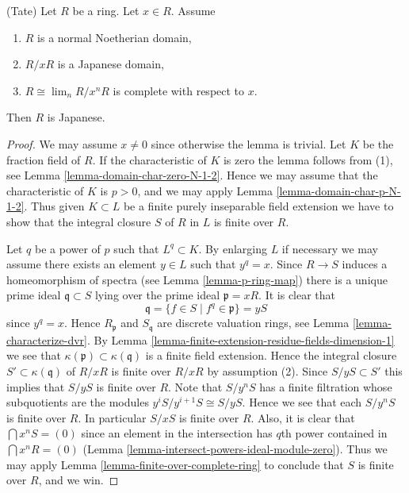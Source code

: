 \begin{lemma}
\label{lemma-tate-japanese}
(Tate)
Let $R$ be a ring.
Let $x \in R$.
Assume
\begin{enumerate}
\item $R$ is a normal Noetherian domain,
\item $R/xR$ is a Japanese domain,
\item $R \cong \lim_n R/x^nR$ is complete with respect to $x$.
\end{enumerate}
Then $R$ is Japanese.
\end{lemma}

\begin{proof}
We may assume $x \not = 0$ since otherwise the lemma is trivial.
Let $K$ be the fraction field of $R$. If the characteristic of $K$
is zero the lemma follows from (1), see
Lemma \ref{lemma-domain-char-zero-N-1-2}. Hence we may assume
that the characteristic of $K$ is $p > 0$, and we may apply
Lemma \ref{lemma-domain-char-p-N-1-2}. Thus given $K \subset L$
be a finite purely inseparable field extension we have to show
that the integral closure $S$ of $R$ in $L$ is finite over $R$.

\medskip\noindent
Let $q$ be a power of $p$ such that $L^q \subset K$.
By enlarging $L$ if necessary we may assume there exists
an element $y \in L$ such that $y^q = x$. Since $R \to S$
induces a homeomorphism of spectra (see Lemma \ref{lemma-p-ring-map})
there is a unique prime ideal $\mathfrak q \subset S$ lying
over the prime ideal $\mathfrak p = xR$. It is clear that
$$
\mathfrak q = \{f \in S \mid f^q \in \mathfrak p\} = yS
$$
since $y^q = x$. Hence $R_{\mathfrak p}$ and $S_{\mathfrak q}$
are discrete valuation rings, see Lemma \ref{lemma-characterize-dvr}.
By Lemma \ref{lemma-finite-extension-residue-fields-dimension-1} we
see that $\kappa(\mathfrak p) \subset \kappa(\mathfrak q)$ is
a finite field extension. Hence the integral closure
$S' \subset \kappa(\mathfrak q)$ of $R/xR$ is finite over
$R/xR$ by assumption (2). Since $S/yS \subset S'$ this implies
that $S/yS$ is finite over $R$. Note that $S/y^nS$ has a finite
filtration whose subquotients are the modules
$y^iS/y^{i + 1}S \cong S/yS$. Hence we see that each $S/y^nS$
is finite over $R$. In particular $S/xS$ is finite over $R$.
Also, it is clear that $\bigcap x^nS = (0)$ since an element
in the intersection has $q$th power contained in $\bigcap x^nR = (0)$
(Lemma \ref{lemma-intersect-powers-ideal-module-zero}).
Thus we may apply Lemma \ref{lemma-finite-over-complete-ring} to conclude
that $S$ is finite over $R$, and we win.
\end{proof}

